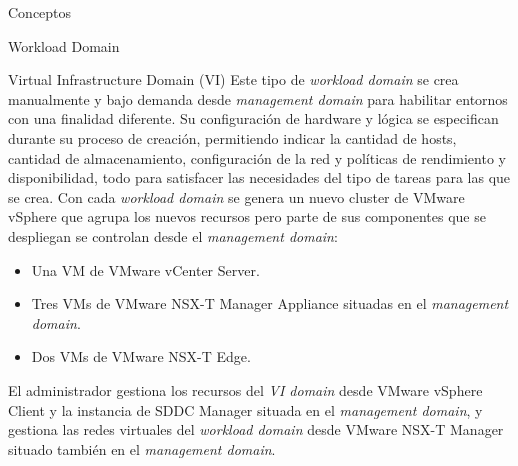 \begin{section}{Conceptos}
\begin{subsection}{Workload Domain}
\begin{subsubsection}{Virtual Infrastructure Domain (VI)}
\label{subsubsec:domainVI}
Este tipo de \textit{workload domain} se crea manualmente y bajo demanda desde \textit{management domain} para habilitar entornos con una finalidad diferente. Su configuración de hardware y lógica se especifican durante su proceso de creación, permitiendo indicar la cantidad de hosts, cantidad de almacenamiento, configuración de la red y políticas de rendimiento y disponibilidad, todo para satisfacer las necesidades del tipo de tareas para las que se crea. Con cada \textit{workload domain} se genera un nuevo cluster de VMware vSphere que agrupa los nuevos recursos pero parte de sus componentes que se despliegan se controlan desde el \textit{management domain}:
\begin{itemize}
  \item Una VM de VMware vCenter Server.
  \item Tres VMs de VMware NSX-T Manager Appliance situadas en el \textit{management domain}.
  \item Dos VMs de VMware NSX-T Edge.
\end{itemize}
El administrador gestiona los recursos del \textit{VI domain} desde VMware vSphere Client y la instancia de SDDC Manager situada en el \textit{management domain}, y gestiona las redes virtuales del \textit{workload domain} desde VMware NSX-T Manager situado también en el \textit{management domain}.


\end{subsubsection}
\end{subsection}
\end{section}
